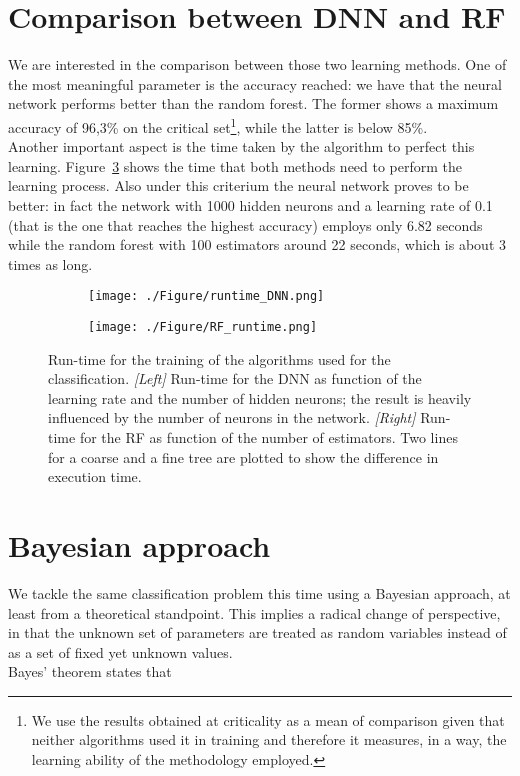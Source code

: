 \documentclass[a4paper,11pt]{article}
\begin{document}
\section{Comparison between DNN and RF }
We are interested in the comparison between those two learning methods. One of the most meaningful parameter is the accuracy reached: we have that the neural network performs better than the random forest. The former shows a maximum accuracy of 96,3\% on the critical set\footnote{We use the results obtained at criticality as a mean of comparison given that neither algorithms used it in training and therefore it measures, in a way, the learning ability of the methodology employed.}, while the latter is below 85\%.
\\
Another important aspect is the time taken by the algorithm to perfect this learning. Figure~\ref{fig: runtime} shows the time that both methods need to perform the learning process. Also under this criterium the neural network proves to be better: in fact the network with 1000 hidden neurons and a learning rate of 0.1 (that is the one that reaches the highest accuracy) employs only 6.82 seconds while the random forest with 100 estimators around 22 seconds, which is about 3 times as long.

\begin{figure}[htp]
    \centering
    \begin{subfigure}{.49\textwidth}
    \centering
    \texttt{[image: ./Figure/runtime\_DNN.png]}
    \label{fig:RF_RT}
    \end{subfigure}%
    \begin{subfigure}{.49\textwidth}
    \texttt{[image: ./Figure/RF\_runtime.png]}
    \label{fig:DNN_runtime}
    \end{subfigure}
    \caption{Run-time for the training of the algorithms used for the classification. \emph{[Left]} Run-time for the DNN as function of the learning rate and the number of hidden neurons; the result is heavily influenced by the number of neurons in the network. \emph{[Right]} Run-time for the RF as function of the number of estimators. Two lines for a coarse and a fine tree are plotted to show the difference in execution time.}
    \label{fig: runtime}
\end{figure}



\section{Bayesian approach}
We tackle the same classification problem this time using a Bayesian approach, at least from a theoretical standpoint. This implies a radical change of perspective, in that the unknown set of parameters are treated as random variables instead of as a set of fixed yet unknown values.
\\
Bayes' theorem states that
\end{document}
